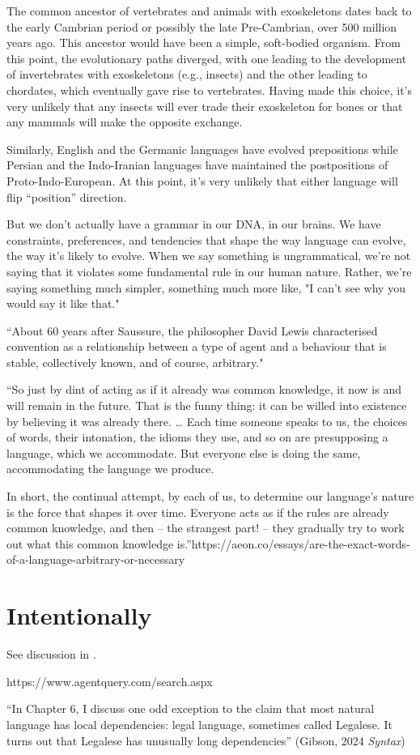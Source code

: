 The common ancestor of vertebrates and animals with exoskeletons dates back to the early Cambrian period or possibly the late Pre-Cambrian, over 500 million years ago. This ancestor would have been a simple, soft-bodied organism. From this point, the evolutionary paths diverged, with one leading to the development of invertebrates with exoskeletons (e.g., insects) and the other leading to chordates, which eventually gave rise to vertebrates. Having made this choice, it's very unlikely that any insects will ever trade their exoskeleton for bones or that any mammals will make the opposite exchange.

Similarly, English and the Germanic languages have evolved prepositions while Persian and the Indo-Iranian languages have maintained the postpositions of Proto-Indo-European. At this point, it's very unlikely that either language will flip ``position'' direction.

But we don't actually have a grammar in our DNA, in our brains. We have constraints, preferences, and tendencies that shape the way language can evolve, the way it's likely to evolve. When we say something is ungrammatical, we're not saying that it violates some fundamental rule in our human nature. Rather, we're saying something much simpler, something much more like, "I can't see why you would say it like that."

``About 60 years after Saussure, the philosopher David Lewis characterised convention as a relationship between a type of agent and a behaviour that is stable, collectively known, and of course, arbitrary."

``So just by dint of acting as if it already was common knowledge, it now is and will remain in the future. That is the funny thing: it can be willed into existence by believing it was already there.
\dots
Each time someone speaks to us, the choices of words, their intonation, the idioms they use, and so on are presupposing a language, which we accommodate. But everyone else is doing the same, accommodating the language we produce.

In short, the continual attempt, by each of us, to determine our language’s nature is the force that shapes it over time. Everyone acts as if the rules are already common knowledge, and then – the strangest part! – they gradually try to work out what this common knowledge is.''https://aeon.co/essays/are-the-exact-words-of-a-language-arbitrary-or-necessary

\section{Intentionally}

See discussion in \citet[315--]{Hurford2007}.

https://www.agentquery.com/search.aspx

``In Chapter 6, I discuss one odd exception to the claim that most natural language has local dependencies: legal language, sometimes called Legalese. It turns out that Legalese has unusually long dependencies'' (Gibson, 2024 \textit{Syntax})